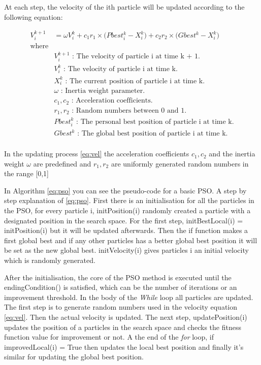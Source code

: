 \documentclass{pdfmx4020}
\begin{document}
    At each step, the velocity of the ith particle will be updated according to the following equation:

    \begin{equation} \label{eq:vel}
      \begin{split}
        V_{i}^{k+1} & = \omega V_{i}^{k} + c_1 r_1 \times \Big( Pbest_{i}^{k} - X_{i}^{k} \Big) + c_2 r_2 \times \Big( Gbest^{k} - X_{i}^{k} \Big) \\
        \text{where} & \\
        & V_i^{k+1} \text{ : The velocity of particle i at time k + 1.} \\
        & V_i^k \text{ : The velocity of particle i at time k.} \\
        & X_i^k \text{ : The current position of particle i at time k.} \\
        & \omega \text{ : Inertia weight parameter.} \\
        & c_1, c_2 \text{ : Acceleration coefficients.} \\
        & r_1, r_2 \text{ : Random numbers between 0 and 1.} \\
        & Pbest_i^k \text{ : The personal best position of particle i at time k.} \\
        & Gbest^k \text{ : The global best position of particle i at time k.} \\
      \end{split}
    \end{equation}

    In the updating process \ref{eq:vel} the acceleration coefficients $c_1, c_2$ and the inertia weight $\omega$ are predefined and $r_1, r_2$ are uniformly generated random numbers in the range [0,1]

    In Algorithm \ref{eq:pso} you can see the pseudo-code for a basic PSO. A step by step explanation of \ref{eq:pso}. First there is an initialisation for all the particles in the PSO, for every particle i, initPosition(i) randomly created a particle with a designated position in the search space. For the first step, initBestLocal(i) = initPosition(i) but it will be updated afterwards. Then the if function makes a first global best and if any other particles has a better global best position it will be set as the new global best. initVelocity(i) gives particles i an initial velocity which is randomly generated. 

    After the initialisation, the core of the PSO method is executed until the endingCondition() is satisfied, which can be the number of iterations or an improvement threshold. In the body of the \textit{While} loop all particles are updated. The first step is to generate random numbers used in the velocity equation \ref{eq:vel}. Then the actual velocity is updated. The next step, updatePosition(i) updates the position of a particles in the search space and checks the fitness function value for improvement or not. A the end of the \textit{for} loop, if improvedLocal(i) = True then updates the local best position and finally it's similar for updating the global best position. 
\end{document}
